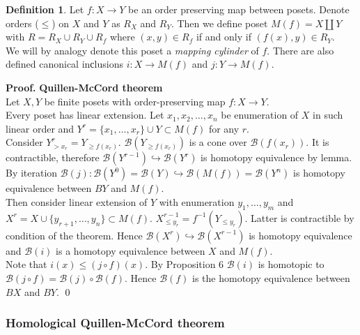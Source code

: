 \documentclass[a4paper, 12pt]{article}
\theoremstyle{definition}
\newtheorem{definition}{Definition}
\theoremstyle{remark}
\newenvironment{pf}{\noindent\textbf{Proof.}}{\qed}
\newcommand{\define}[1]{{\textit{#1}}}
\renewcommand{\leq}{\leqslant}
\renewcommand{\geq}{\geqslant}
\begin{document}
\begin{definition}
  Let $f : X \to Y$ be an order preserving map between posets. Denote orders ($\leq$) on $X$ and $Y$ as $R_X$ and $R_Y$. Then we define poset $M(f) = X \coprod Y$ with $R = R_X \cup R_Y \cup R_{f}$ where $(x,y) \in R_f$ if and only if $(f(x),y) \in R_Y$.\\

  We will by analogy denote this poset a \define{mapping cylinder} of $f$. There are also defined canonical inсlusions $i : X \to M(f)$ and $j : Y \to M(f)$.
\end{definition}

\begin{pf} \textbf{Quillen-McCord theorem}\\
  Let $X, Y$ be finite posets with order-preserving map $f : X \to Y$.\\

  Every poset has linear extension. Let $x_1, x_2, \ldots, x_n$ be enumeration of $X$ in such linear order and $Y^r = \{x_1,\ldots,x_r\} \cup Y \subset M(f)$ for any $r$.\\

  Consider $Y^r_{>x_r} = Y_{\geq f(x_r)}$. $\mathcal{B}(Y_{\geq f(x_r)})$ is a cone over $\mathcal{B}(f(x_r))$. It is contractible, therefore $\mathcal{B}(Y^{r-1}) \hookrightarrow \mathcal{B}(Y^{r})$ is homotopy equivalence by lemma. By iteration $\mathcal{B}(j) : \mathcal{B}(Y^{0}) = \mathcal{B}(Y) \hookrightarrow \mathcal{B}(M(f)) = \mathcal{B}(Y^n)$ is homotopy equivalence between $BY$ and $M(f)$.\\

  Then consider linear extension of $Y$ with enumeration $y_1,\ldots,y_m$ and $X^r = X \cup \{y_{r+1},\ldots,y_n\} \subset M(f)$. $X^{r-1}_{\leq y_r} = f^{-1}(Y_{\leqslant y_r})$. Latter is contractible by condition of the theorem. Hence $\mathcal{B}(X^{r}) \hookrightarrow \mathcal{B}(X^{r-1})$ is homotopy equivalence and $\mathcal{B}(i)$ is a homotopy equivalence between $X$ and $M(f)$.\\

  Note that $i(x) \leqslant (j \circ f)(x)$. By Proposition 6 $\mathcal{B}(i)$ is homotopic to $\mathcal{B}(j \circ f) = \mathcal{B}(j) \circ \mathcal{B}(f)$. Hence $\mathcal{B}(f)$ is the homotopy equivalence between $BX$ and $BY$.
\end{pf}

\subsubsection{Homological Quillen-McCord theorem}
\end{document}

